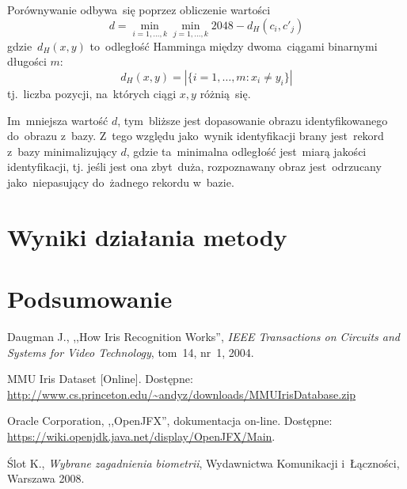 \documentclass[11pt,a4paper]{article}
\begin{document}
Porównywanie odbywa~się poprzez obliczenie wartości
$$ d = \min_{i=1,\dots,k} \min_{j=1,\dots,k} 2048 - d_H(c_i, c'_j) $$
gdzie~$d_H(x, y)$ to~odległość Hamminga między dwoma~ciągami binarnymi długości $m$:
$$ d_H(x, y) = \left| \{ i=1,\dots,m : x_i \neq y_i \} \right| $$
tj.~liczba pozycji, na~których ciągi $x, y$ różnią~się.

Im~mniejsza wartość $d$, tym~bliższe jest dopasowanie obrazu identyfikowanego do~obrazu z~bazy.
Z~tego względu jako~wynik identyfikacji brany jest~rekord z~bazy minimalizujący $d$, gdzie ta~minimalna odległość jest~miarą jakości identyfikacji, tj. jeśli jest ona zbyt~duża, rozpoznawany obraz jest~odrzucany jako~niepasujący do~żadnego rekordu w~bazie.

\section{Wyniki działania metody}

\section{Podsumowanie}

\begin{thebibliography}{9}

        Daugman J.,
        ,,How Iris Recognition Works'',
        \emph{IEEE Transactions on Circuits and Systems for Video Technology},
        tom~14,
        nr~1,
        2004.
        
        MMU Iris Dataset
        [Online].
        Dostępne: \url{http://www.cs.princeton.edu/~andyz/downloads/MMUIrisDatabase.zip}

        Oracle Corporation,
        ,,OpenJFX'',
        dokumentacja on-line.
        Dostępne: \url{https://wiki.openjdk.java.net/display/OpenJFX/Main}.

        Ślot K.,
        \emph{Wybrane zagadnienia biometrii},
        Wydawnictwa Komunikacji i~Łączności,
        Warszawa 2008.

\end{thebibliography}
\end{document}
